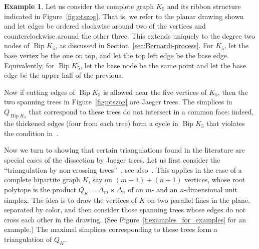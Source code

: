 \documentclass[10pt]{amsart}
\theoremstyle{definition}\newtheorem{defi}[theo]{Definition}
\newtheorem{exam}[theo]{Example}
\theoremstyle{remark}\newtheorem{rema}[theo]{Remark}
\DeclareMathOperator{\bip}{Bip}
\begin{document}
\begin{exam}
\label{ex:otszog}
Let us consider the complete graph $K_5$ and its ribbon structure indicated in Figure~\ref{fig:otszog}. That is, we refer to the planar drawing shown and let edges be ordered clockwise around two of the vertices and counterclockwise around the other three. This extends uniquely to the degree two nodes of $\bip K_5$, as discussed in Section~\ref{sec:Bernardi-process}. For $K_5$, let the base vertex be the one on top, and let the top left edge be the base edge. Equivalently, for $\bip K_5$, let the base node be the same point and let the base edge be the upper half of the previous.

Now if cutting edges of $\bip K_5$ is allowed near the five vertices of $K_5$, then the two spanning trees in Figure~\ref{fig:otszog} are Jaeger trees. The simplices in $Q_{\bip K_5}$ that correspond to these trees do not intersect in a common face: indeed, the thickened edges (four from each tree) form a cycle in $\bip K_5$ that violates the condition in~\cite[Lemma~12.6]{alex}.
\end{exam}

Now we turn to showing that certain triangulations found in the literature are special cases of the dissection by Jaeger trees. Let us first consider the ``triangulation by non-crossing trees''~\cite{GGP}, see also~\cite[Example~5.3]{KP_Ehrhart}. This applies in the case of a complete bipartite graph $K$, say on $(m+1)+(n+1)$ vertices, whose root polytope is the product $Q_K=\Delta_m\times\Delta_n$ of an $m$- and an $n$-dimensional unit simplex. The idea is to draw the vertices of $K$ on two parallel lines in the plane, separated by color, and then consider those spanning trees whose edges do not cross each other in the drawing. (See Figure~\ref{f:examples_for_examples} for an example.) The maximal simplices corresponding to these trees form a triangulation of $Q_K$.
\end{document}
